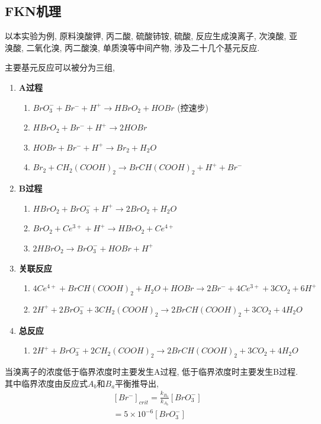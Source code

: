 \documentclass[a4paper]{article}
\begin{document}
\subsection{FKN机理}
以本实验为例, 原料溴酸钾, 丙二酸, 硫酸铈铵, 硫酸, 反应生成溴离子,
次溴酸, 亚溴酸, 二氧化溴, 丙二酸溴, 单质溴等中间产物, 
涉及二十几个基元反应.\par
主要基元反应可以被分为三组,
\begin{enumerate}
	\item \textbf{A过程}
	\begin{enumerate}
		\item $BrO_{3}^{-} + Br^{-} + H^{+} \to HBrO_{2} + HOBr$ (控速步)
		\item $HBrO_{2} + Br^{-} + H^{+} \to 2HOBr$
		\item $HOBr + Br^{-} + H^{+} \to Br_{2} + H_{2}O$
		\item $Br_{2} + CH_{2}(COOH)_{2} 
				\to BrCH(COOH)_{2} + H^{+} + Br^{-}$
	\end{enumerate}
	\item \textbf{B过程}
	\begin{enumerate}
		\item $HBrO_{2} + BrO_{3}^{-} + H^{+}
				\to 2BrO_{2} + H_{2}O$
		\item $BrO_{2} + Ce^{3+} + H^{+}
				\to HBrO_{2} + Ce^{4+}$
		\item $2HBrO_{2}
				\to BrO_{3}^{-} + HOBr + H^{+}$
	\end{enumerate}
	\item \textbf{关联反应}
	\begin{enumerate}
		\item $4Ce^{4+} + BrCH(COOH)_{2} + H_{2}O + HOBr 
				\to 2Br^{-} + 4Ce^{3+} + 3CO_{2} + 6H^{+}$
		\item $2H^{+} + 2BrO_{3}^{-} + 3CH_{2}(COOH)_{2} 
				\to 2BrCH(COOH)_{2} + 3CO_{2} + 4H_{2}O$
	\end{enumerate}
	\item \textbf{总反应}
	\begin{enumerate}
		\item $2H^{+} + BrO_{3}^{-} + 2CH_{2}(COOH)_{2} 
				\to 2BrCH(COOH)_{2} + 3CO_{2} + 4H_{2}O$
	\end{enumerate}
\end{enumerate}
\par
当溴离子的浓度低于临界浓度时主要发生A过程, 
低于临界浓度时主要发生B过程. 其中临界浓度由反应式$A_{b}$和$B_{a}$平衡推导出, \\
\begin{equation}
	\begin{aligned}
			&[Br^{-}]_{crit} = \frac{k_{B_a}}{k_{A_b}}[BrO_{3}^{-}]\\
			&= 5\times 10^{-6} [BrO_{3}^{-}]\\
	\end{aligned}
\end{equation}
\end{document}

